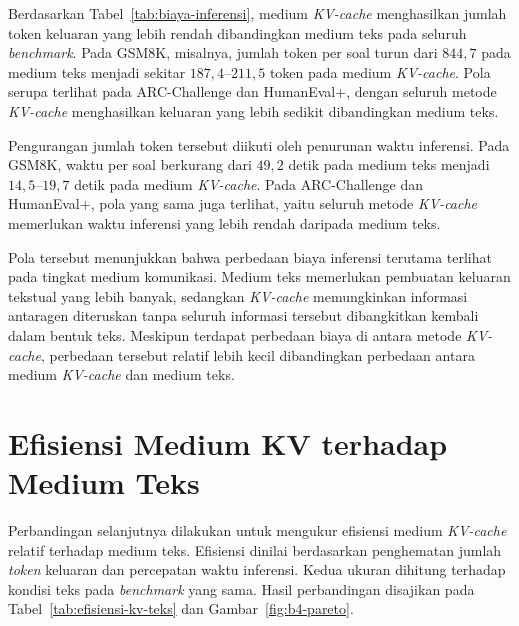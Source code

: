 Berdasarkan Tabel~\ref{tab:biaya-inferensi}, medium \textit{KV-cache} menghasilkan
jumlah token keluaran yang lebih rendah dibandingkan medium teks pada seluruh
\textit{benchmark}. Pada GSM8K, misalnya, jumlah token per soal turun dari
$844{,}7$ pada medium teks menjadi sekitar $187{,}4$--$211{,}5$ token pada
medium \textit{KV-cache}. Pola serupa terlihat pada ARC-Challenge dan
HumanEval+, dengan seluruh metode \textit{KV-cache} menghasilkan keluaran
yang lebih sedikit dibandingkan medium teks.

Pengurangan jumlah token tersebut diikuti oleh penurunan waktu inferensi.
Pada GSM8K, waktu per soal berkurang dari $49{,}2$ detik pada medium teks
menjadi $14{,}5$--$19{,}7$ detik pada medium \textit{KV-cache}. Pada
ARC-Challenge dan HumanEval+, pola yang sama juga terlihat, yaitu seluruh
metode \textit{KV-cache} memerlukan waktu inferensi yang lebih rendah
daripada medium teks.

Pola tersebut menunjukkan bahwa perbedaan biaya inferensi terutama terlihat
pada tingkat medium komunikasi. Medium teks memerlukan pembuatan keluaran
tekstual yang lebih banyak, sedangkan \textit{KV-cache} memungkinkan informasi
antaragen diteruskan tanpa seluruh informasi tersebut dibangkitkan kembali
dalam bentuk teks. Meskipun terdapat perbedaan biaya di antara metode
\textit{KV-cache}, perbedaan tersebut relatif lebih kecil dibandingkan
perbedaan antara medium \textit{KV-cache} dan medium teks.

\section{Efisiensi Medium KV terhadap Medium Teks}
\label{sec:efisiensi-medium-kv-teks}

Perbandingan selanjutnya dilakukan untuk mengukur efisiensi medium
\textit{KV-cache} relatif terhadap medium teks. Efisiensi dinilai berdasarkan
penghematan jumlah \textit{token} keluaran dan percepatan waktu inferensi.
Kedua ukuran dihitung terhadap kondisi teks pada \textit{benchmark} yang sama.
Hasil perbandingan disajikan pada Tabel~\ref{tab:efisiensi-kv-teks} dan
Gambar~\ref{fig:b4-pareto}.

